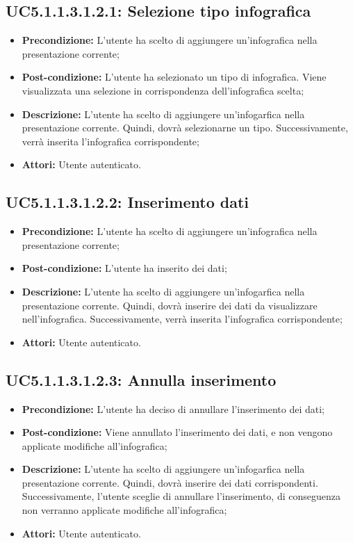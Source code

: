 \subsection{ UC5.1.1.3.1.2.1: Selezione tipo infografica}

\begin{itemize}
	\item \textbf{Precondizione:} L'utente ha scelto di aggiungere un'infografica nella presentazione corrente;
	\item \textbf{Post-condizione:} L'utente ha selezionato un tipo di infografica. Viene visualizzata una selezione in corrispondenza dell'infografica scelta;
	\item \textbf{Descrizione:} L'utente ha scelto di aggiungere un'infogarfica nella presentazione corrente. Quindi, dovrà selezionarne un tipo. Successivamente, verrà inserita l'infografica corrispondente;
	\item \textbf{Attori:} Utente autenticato.
\end{itemize}
\subsection{ UC5.1.1.3.1.2.2: Inserimento dati}

\begin{itemize}
	\item \textbf{Precondizione:} L'utente ha scelto di aggiungere un'infografica nella presentazione corrente;
	\item \textbf{Post-condizione:} L'utente ha inserito dei dati;
	\item \textbf{Descrizione:} L'utente ha scelto di aggiungere un'infogarfica nella presentazione corrente. Quindi, dovrà inserire dei dati da visualizzare nell'infografica. Successivamente, verrà inserita l'infografica corrispondente;
	\item \textbf{Attori:} Utente autenticato.
\end{itemize}
\subsection{ UC5.1.1.3.1.2.3: Annulla inserimento}

\begin{itemize}
	\item \textbf{Precondizione:} L'utente ha deciso di annullare l'inserimento dei dati;
	\item \textbf{Post-condizione:} Viene annullato l'inserimento dei dati, e non vengono applicate modifiche all'infografica;
	\item \textbf{Descrizione:} L'utente ha scelto di aggiungere un'infogarfica nella presentazione corrente. Quindi, dovrà inserire dei dati corrispondenti. Successivamente, l'utente sceglie di annullare l'inserimento, di conseguenza non verranno applicate modifiche all'infografica;
	\item \textbf{Attori:} Utente autenticato.
\end{itemize}
